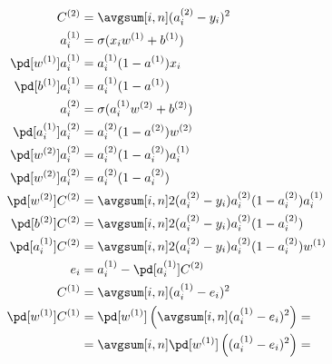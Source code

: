 \documentclass{article}
\begin{document}
	\begin{align}
    	C^{(2)} &= \avgsum[i, n] (a_i^{(2)} - y_i)^2 \\
    	a_i^{(1)} &= \sigma(x_iw^{(1)} + b^{(1)}) \\
    	\pd[w^{(1)}] a_i^{(1)}
    		&= a_i^{(1)}(1 - a^{(1)})x_i \\
    	\pd[b^{(1)}] a_i^{(1)}
    		&= a_i^{(1)}(1 - a^{(1)}) \\
    	a_i^{(2)} &= \sigma(a_i^{(1)}w^{(2)} + b^{(2)}) \\
    	\pd[a_i^{(1)}]a_i^{(2)}
    		&= a_i^{(2)}(1 - a^{(2)})w^{(2)} \\
    	\pd[w^{(2)}] a_i^{(2)}
    		&= a_i^{(2)}(1 - a_i^{(2)}) a_i^{(1)} \\
    	\pd[w^{(2)}] a_i^{(2)}
    		&= a_i^{(2)}(1 - a_i^{(2)}) \\
    	\pd[w^{(2)}] C^{(2)}
    		&= \avgsum[i, n] 2(a_i^{(2)} - y_i) a_i^{(2)}(1 - a_i^{(2)}) a_i^{(1)} \\
    	\pd[b^{(2)}] C^{(2)} 
    		&= \avgsum[i, n] 2(a_i^{(2)} - y_i) a_i^{(2)}(1 - a_i^{(2)}) \\
		\pd[a_i^{(1)}] C^{(2)} 
    		&= \avgsum[i, n] 2(a_i^{(2)} - y_i) a_i^{(2)}(1 - a_i^{(2)}) w^{(1)} \\
		e_i &= a_i^{(1)} - \pd[a_i^{(1)}] C^{(2)} \\ %
		C^{(1)} &= \avgsum[i, n] (a_i^{(1)} - e_i)^2 \\
		\pd[w^{(1)}] C^{(1)}
			&= \pd[w^{(1)}] \left(\avgsum[i, n] (a_i^{(1)} - e_i)^2\right) =\\
			&= \avgsum[i, n] \pd[w^{(1)}] \left((a_i^{(1)} - e_i)^2\right) =\\

\end{align}
\end{document}
